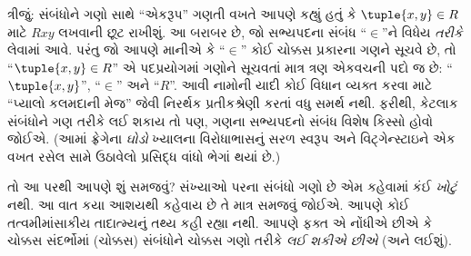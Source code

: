 \documentclass[../../../include/open-logic-section]{subfiles}
\begin{document}
ત્રીજું: સંબંધોને ગણો સાથે “એકરૂપ” ગણતી વખતે આપણે કહ્યું હતું
કે $\tuple{x,y} \in R$ માટે $Rxy$ લખવાની છૂટ રાખીશું.
આ બરાબર છે, જો સભ્યપદના સંબંધ “$\in$”ને વિધેય
\emph{તરીકે} લેવામાં આવે. પરંતુ જો આપણે માનીએ કે “$\in$”
કોઈ ચોક્કસ પ્રકારના ગણને સૂચવે છે, તો “$\tuple{x,y} \in R$”
એ પદપ્રયોગમાં ગણોને સૂચવતાં માત્ર ત્રણ એકવચની પદો જ છે:
“$\tuple{x,y}$”, “$\in$” અને “$R$”.
આવી નામોની યાદી કોઈ વિધાન વ્યક્ત કરવા માટે
“પ્યાલો કલમદાની મેજ” જેવી નિરર્થક પ્રતીકશ્રેણી કરતાં વધુ
સમર્થ નથી. ફરીથી, કેટલાક સંબંધોને ગણ તરીકે લઈ શકાય તો પણ,
ગણના સભ્યપદનો સંબંધ વિશેષ કિસ્સો હોવો જોઈએ.
(આમાં ફ્રેગેના \emph{ઘોડો} ખ્યાલના વિરોધાભાસનું સરળ સ્વરૂપ
અને વિટ્ગેન્સ્ટાઇને એક વખત રસેલ સામે ઉઠાવેલો પ્રસિદ્ધ વાંધો
ભેગાં થયાં છે.)

તો આ પરથી આપણે શું સમજવું? સંખ્યાઓ પરના સંબંધો ગણો છે એમ
કહેવામાં કંઈ \emph{ખોટું} નથી. આ વાત કયા આશયથી કહેવાય છે
તે માત્ર સમજવું જોઈએ. આપણે કોઈ તત્વમીમાંસાકીય તાદાત્મ્યનું
તથ્ય કહી રહ્યા નથી. આપણે ફક્ત એ નોંધીએ છીએ કે ચોક્કસ
સંદર્ભોમાં (ચોક્કસ) સંબંધોને ચોક્કસ ગણો તરીકે
\emph{લઈ શકીએ છીએ} (અને લઈશું).
\end{document}

